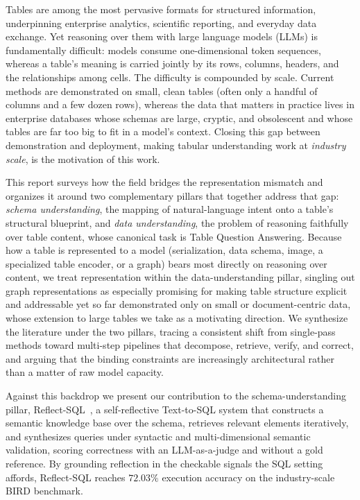 Tables are among the most pervasive formats for structured information, underpinning enterprise analytics, scientific reporting, and everyday data exchange. Yet reasoning over them with large language models (LLMs) is fundamentally difficult: models consume one-dimensional token sequences, whereas a table's meaning is carried jointly by its rows, columns, headers, and the relationships among cells. The difficulty is compounded by scale. Current methods are demonstrated on small, clean tables (often only a handful of columns and a few dozen rows), whereas the data that matters in practice lives in enterprise databases whose schemas are large, cryptic, and obsolescent and whose tables are far too big to fit in a model's context. Closing this gap between demonstration and deployment, making tabular understanding work at \emph{industry scale}, is the motivation of this work. 

This report surveys how the field bridges the representation mismatch and organizes it around two complementary pillars that together address that gap: \emph{schema understanding}, the mapping of natural-language intent onto a table's structural blueprint, and \emph{data understanding}, the problem of reasoning faithfully over table content, whose canonical task is Table Question Answering. Because how a table is represented to a model (serialization, data schema, image, a specialized table encoder, or a graph) bears most directly on reasoning over content, we treat representation within the data-understanding pillar, singling out graph representations as especially promising for making table structure explicit and addressable yet so far demonstrated only on small or document-centric data, whose extension to large tables we take as a motivating direction. We synthesize the literature under the two pillars, tracing a consistent shift from single-pass methods toward multi-step pipelines that decompose, retrieve, verify, and correct, and arguing that the binding constraints are increasingly architectural rather than a matter of raw model capacity.

Against this backdrop we present our contribution to the schema-understanding pillar, Reflect-SQL~\cite{jain2027reflectsql}, a self-reflective Text-to-SQL system that constructs a semantic knowledge base over the schema, retrieves relevant elements iteratively, and synthesizes queries under syntactic and multi-dimensional semantic validation, scoring correctness with an LLM-as-a-judge and without a gold reference. By grounding reflection in the checkable signals the SQL setting affords, Reflect-SQL reaches $72.03\%$ execution accuracy on the industry-scale BIRD benchmark.

